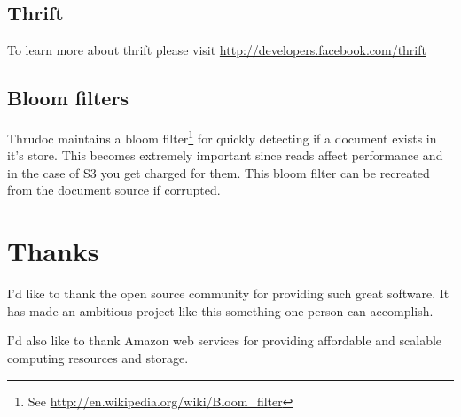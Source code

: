 \documentclass[nocopyrightspace,blockstyle]{sigplanconf}
\begin{document}
\subsection{Thrift}

To learn more about thrift please visit \url{http://developers.facebook.com/thrift}

\subsection{Bloom filters}

Thrudoc maintains a bloom filter\footnote{See \url{http://en.wikipedia.org/wiki/Bloom_filter}}
for quickly detecting if a document exists in it's store.
This becomes extremely important since reads affect performance and in the case of S3 you get charged for them.
This bloom filter can be recreated from the document source if corrupted.

\section{Thanks}

I'd like to thank the open source community for providing such great software.
It has made an ambitious project like this something one person can accomplish.

I'd also like to thank Amazon web services for providing affordable and scalable
computing resources and storage.
\end{document}
